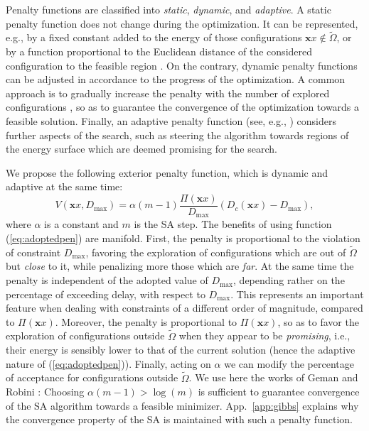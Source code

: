 \documentclass[draftcls,onecolumn]{IEEEtran}
\theoremstyle{plain}
\theoremstyle{definition}
\def\config{\mathbf{x}}
\def\objective{{\Pi}} \def\constraint{{\cal D}}
\def\constraintmax{D_{\mbox{{\tiny max}}}}
\def\objective{{\Pi}} \def\constraint{D_c} \def\constraintmax{D_{\mbox{{\tiny max}}}}
\begin{document}
Penalty functions are classified into {\it static}, {\it dynamic}, and {\it adaptive}. A static penalty function does not change during the optimization. It can be represented, e.g., by a fixed constant added to the energy of those configurations $\config{x}\not \in \tilde{\Omega}$, or by a function proportional to the Euclidean distance of the considered configuration to the feasible region \cite{Richardson90}. On the contrary, dynamic penalty functions can be adjusted in accordance to the progress of the optimization. A common approach is to gradually increase the penalty with the number of explored configurations \cite{Joines94}, so as to guarantee the convergence of the optimization towards a feasible solution. Finally, an adaptive penalty function (see, e.g., \cite{Coit96,Bean92}) considers further aspects of the search, such as steering the algorithm towards regions of the energy surface which are deemed promising for the search.    

We propose the following exterior penalty function, which is dynamic and adaptive at the same time: 
\begin{equation}\label{eq:adoptedpen}
    V(\config{x}, D_{\max}) = \alpha (m-1)\frac{ \objective(\config{x})}{D_{\max}}(D_c(\config{x})-D_{\max}),
\end{equation}
where $\alpha$ is a constant and $m$ is the SA step.
The benefits of using function (\ref{eq:adoptedpen}) are manifold. First, the penalty is proportional to the violation of constraint $D_{\max}$, favoring the exploration of configurations which are out of $\tilde{\Omega}$ but {\it close} to it, while penalizing more those which are {\it far}. At the same time the penalty is independent of the adopted value of $D_{\max}$, depending rather on the percentage of exceeding delay, with respect to $D_{\max}$. This represents an important feature when dealing with constraints of a different order of magnitude, compared to $\objective(\config{x})$. Moreover, the penalty is proportional to $\objective(\config{x})$, so as to favor the exploration of configurations outside $\tilde{\Omega}$ when they appear to be {\it promising}, i.e., their energy is sensibly lower to that of the current solution (hence the adaptive nature of (\ref{eq:adoptedpen})). Finally, acting on $\alpha$ we can modify the percentage of acceptance for configurations outside $\tilde{\Omega}$. We use here the works of Geman and Robini \cite{geman-graffigne, robini-bresler-magnin}: Choosing $\alpha(m-1) > \log(m)$ is sufficient to guarantee convergence of the SA algorithm towards a feasible minimizer. App.~\ref{app:gibbs} explains why the convergence property of the SA is maintained with such a penalty function. 
\end{document}

